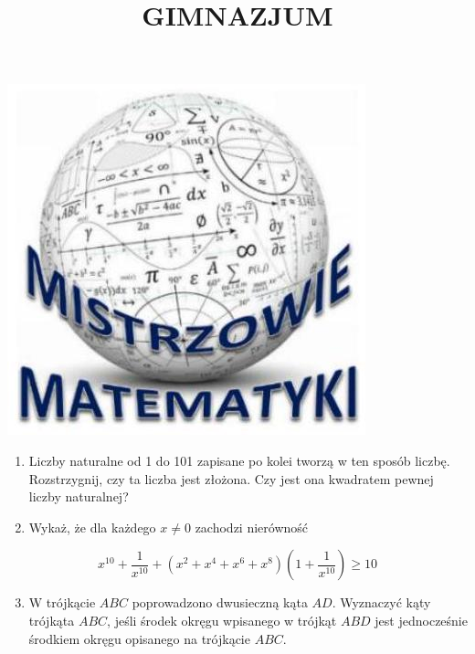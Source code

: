 \documentclass[10pt]{article}
\title{GIMNAZJUM }
\author{}
\date{}
\begin{document}
\maketitle
\begin{center}
\includegraphics[max width=\textwidth]{2024_11_21_a4c91e41c0616c141623g-1}
\end{center}

\begin{enumerate}
  \item Liczby naturalne od 1 do 101 zapisane po kolei tworzą w ten sposób liczbę. Rozstrzygnij, czy ta liczba jest złożona. Czy jest ona kwadratem pewnej liczby naturalnej?
  \item Wykaż, że dla każdego \(x \neq 0\) zachodzi nierówność
\end{enumerate}

\[
x^{10}+\frac{1}{x^{10}}+\left(x^{2}+x^{4}+x^{6}+x^{8}\right)\left(1+\frac{1}{x^{10}}\right) \geq 10
\]

\begin{enumerate}
  \setcounter{enumi}{2}
  \item W trójkącie \(A B C\) poprowadzono dwusieczną kąta \(A D\). Wyznaczyć kąty trójkąta \(A B C\), jeśli środek okręgu wpisanego w trójkąt \(A B D\) jest jednocześnie środkiem okręgu opisanego na trójkącie \(A B C\).
\end{enumerate}
\end{document}
